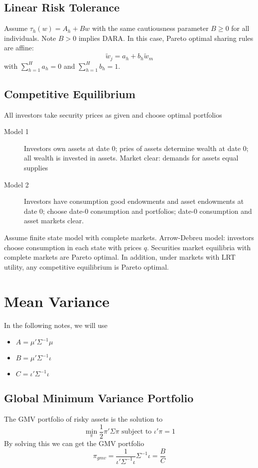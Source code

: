 \documentclass[11pt, a4paper, oneside]{article}
\theoremstyle{definition}
\theoremstyle{proposition}
\theoremstyle{corollary}
\theoremstyle{lemma}
\theoremstyle{theorem}
\begin{document}
\subsection{Linear Risk Tolerance}
Assume $\tau_h(w) = A_h + Bw$ with the same cautiousness parameter $B\geq 0$ for all individuals. Note $B > 0$ implies DARA. In this case, Pareto optimal sharing rules are affine:
$$\tilde{w}_j = a_h + b_h \tilde{w}_m$$ 
with $\sum_{h=1}^H a_h = 0$ and $\sum_{h=1}^H b_h = 1$. 

\subsection{Competitive Equilibrium}
All investors take security prices as given and choose optimal portfolios
\begin{description}
\item[Model 1] Investors own assets at date 0; pries of assets determine wealth at date 0; all wealth is invested in assets. Market clear: demands for assets equal supplies
\item[Model 2] Investors have consumption good endowments and asset endowments at date 0; choose date-0 consumption and portfolios; date-0 consumption and asset markets clear. 
\end{description}

Assume finite state model with complete markets. Arrow-Debreu model: investors choose consumption in each state with prices $q$. Securities market equilibria with complete markets are Pareto optimal. In addition, under markets with LRT utility, any competitive equilibrium is Pareto optimal. 

\section{Mean Variance}
In the following notes, we will use
\begin{itemize}
\item $A = \mu'\Sigma^{-1}\mu$
\item $B = \mu'\Sigma^{-1}\iota$
\item $C = \iota'\Sigma^{-1}\iota$
\end{itemize}

\subsection{Global Minimum Variance Portfolio}
The GMV portfolio of risky assets is the solution to
$$\min_{\pi} \frac{1}{2}\pi'\Sigma \pi \text{ subject to } \iota'\pi = 1$$
By solving this we can get the GMV portfolio 
$$\pi_{gmv} = \frac{1}{\iota'\Sigma^{-1}\iota} \Sigma^{-1}\iota = \frac{B}{C}$$ 
\end{document}
